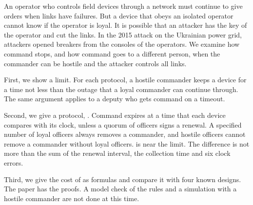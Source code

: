 An operator who controls field devices through a network must continue to give orders when
links have failures. But a device that obeys an isolated operator cannot know if the operator is
loyal. It is possible that an attacker has the key of the operator and cut the links. In the
2015 attack on the Ukrainian power grid, attackers opened breakers from the consoles of the
operators. We examine how command stops, and how command goes to a different person, when
the commander can be hostile and the attacker controls all links.

First, we show a limit. For each protocol, a hostile commander keeps a device for a time
not less than the outage that a loyal commander can continue through. The same
argument applies to a deputy who gets command on a timeout.

Second, we give a protocol, \sys{}. Command expires at a time that each device compares
with its clock, unless a quorum of officers signs a renewal. A specified number of loyal
officers always removes a commander, and hostile officers cannot remove a commander without
loyal officers. \sys{} is near the limit. The difference is not more than the sum of the
renewal interval, the collection time and six clock errors.

Third, we give the cost of \sys{} as formulas and compare it with four known designs. The
paper has the proofs. A model check of the rules and a simulation with a hostile commander
are not done at this time.
